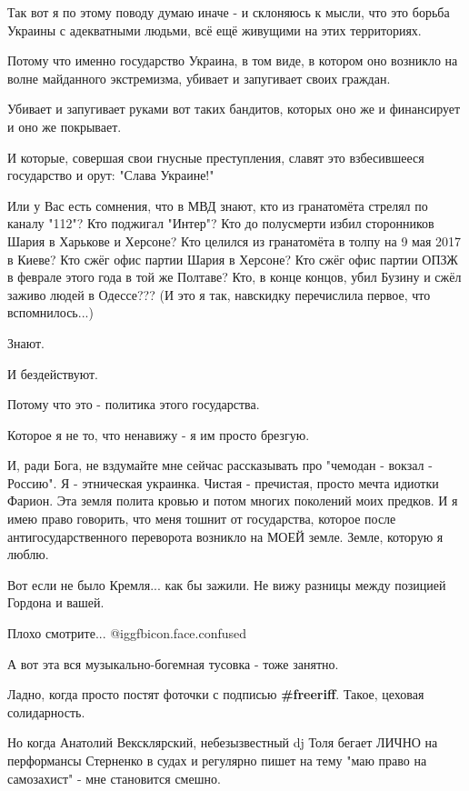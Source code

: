 \begin{itemize}
\begin{itemize}
Так вот я по этому поводу думаю иначе - и склоняюсь к мысли, что это борьба
Украины с адекватными людьми, всё ещё живущими на этих территориях.

Потому что именно государство Украина, в том виде, в котором оно возникло на
волне майданного экстремизма, убивает и запугивает своих граждан.

Убивает и запугивает руками вот таких бандитов, которых оно же и финансирует и оно же покрывает.

И которые, совершая свои гнусные преступления, славят это взбесившееся
государство и орут: "Слава Украине!"

Или у Вас есть сомнения, что в МВД знают, кто из гранатомёта стрелял по каналу
"112"? Кто поджигал "Интер"? Кто до полусмерти избил сторонников Шария в
Харькове и Херсоне? Кто целился из гранатомёта в толпу на 9 мая 2017 в Киеве?
Кто сжёг офис партии Шария в Херсоне? Кто сжёг офис партии ОПЗЖ в феврале этого
года в той же Полтаве? Кто, в конце концов, убил Бузину и сжёл заживо людей в
Одессе??? (И это я так, навскидку перечислила первое, что вспомнилось...)

Знают.

И бездействуют.

Потому что это - политика этого государства.

Которое я не то, что ненавижу - я им просто брезгую.

И, ради Бога, не вздумайте мне сейчас рассказывать про "чемодан - вокзал -
Россию". Я - этническая украинка. Чистая - пречистая, просто мечта идиотки
Фарион. Эта земля полита кровью и потом многих поколений моих предков. И я имею
право говорить, что меня тошнит от государства, которое после
антигосударственного переворота возникло на МОЕЙ земле. Земле, которую я люблю.

\end{itemize} %

Вот если не было Кремля... как бы зажили. Не вижу разницы между позицией Гордона и вашей.

Плохо смотрите... @igg{fbicon.face.confused} 


А вот эта вся музыкально-богемная тусовка - тоже занятно.

Ладно, когда просто постят фоточки с подписью \textbf{\#freeriff}. Такое, цеховая солидарность.

Но когда Анатолий Вексклярский, небезызвестный dj Толя бегает ЛИЧНО на
перформансы Стерненко в судах и регулярно пишет на тему "маю право на
самозахист" - мне становится смешно.


\end{itemize}
